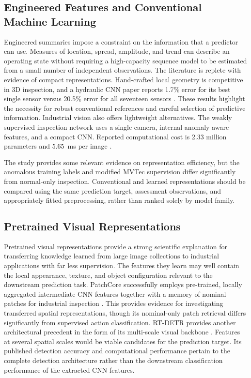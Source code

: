\subsection{Engineered Features and Conventional Machine Learning}

Engineered summaries impose a constraint on the information that a predictor can use. Measures of
location, spread, amplitude, and trend can describe an operating state without requiring a
high-capacity sequence model to be estimated from a small number of independent observations.
The literature is replete with evidence of compact representations. Hand-crafted local geometry is
competitive in 3D inspection, and a hydraulic CNN paper reports 1.7\% error for its best single
sensor versus 20.5\% error for all seventeen sensors \parencite{Horwitz2023Back,Goodarzi2023Deep}.
These results highlight the necessity for robust conventional references and careful selection of
predictive information.
Industrial vision also offers lightweight alternatives. The weakly supervised inspection network
uses a single camera, internal anomaly-aware features, and a compact CNN. Reported computational
cost is 2.33 million parameters and 5.65~ms per image \parencite[Table~V]{P035}.

The study provides some relevant evidence on representation efficiency, but the anomalous training
labels and modified MVTec supervision differ significantly from normal-only inspection.
Conventional and learned representations should be compared using the same prediction target,
assessment observations, and appropriately fitted preprocessing, rather than ranked solely by model
family.

\subsection{Pretrained Visual Representations}

Pretrained visual representations provide a strong scientific explanation for transferring knowledge
learned from large image collections to industrial applications with far less supervision. The
features they learn may well contain the local appearance, texture, and object configuration
relevant to the downstream prediction task.
PatchCore successfully employs pre-trained, locally aggregated intermediate CNN features together
with a memory of nominal patches for industrial inspection \parencite[Section~3]{Roth2022Towards}.
This provides evidence for investigating transferred spatial representations, though its
nominal-only patch retrieval differs significantly from supervised action classification.
RT-DETR provides another architectural precedent in the form of its multi-scale visual backbone
\parencite[Sections~4.1--4.2]{Zhao2024RTDETR}. Features at several spatial scales would be viable
candidates for the prediction target.
Its published detection accuracy and computational performance pertain to the complete detection
architecture rather than the downstream classification performance of the extracted CNN features.

